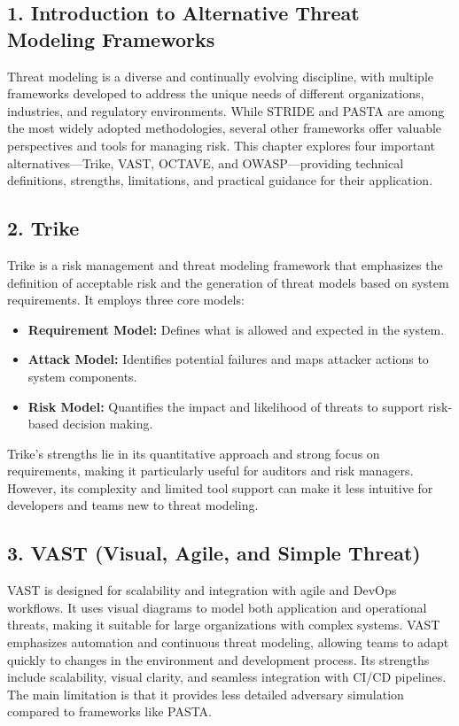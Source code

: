 

\subsection*{1. Introduction to Alternative Threat Modeling Frameworks}
Threat modeling is a diverse and continually evolving discipline, with multiple frameworks developed to address the unique needs of different organizations, industries, and regulatory environments. While STRIDE and PASTA are among the most widely adopted methodologies, several other frameworks offer valuable perspectives and tools for managing risk. This chapter explores four important alternatives—Trike, VAST, OCTAVE, and OWASP—providing technical definitions, strengths, limitations, and practical guidance for their application\cite{owasp,nist800154}.

\subsection*{2. Trike}
Trike is a risk management and threat modeling framework that emphasizes the definition of acceptable risk and the generation of threat models based on system requirements\cite{uceda2015}. It employs three core models:
\begin{itemize}
	\item \textbf{Requirement Model:} Defines what is allowed and expected in the system.
	\item \textbf{Attack Model:} Identifies potential failures and maps attacker actions to system components.
	\item \textbf{Risk Model:} Quantifies the impact and likelihood of threats to support risk-based decision making.
\end{itemize}
Trike’s strengths lie in its quantitative approach and strong focus on requirements, making it particularly useful for auditors and risk managers. However, its complexity and limited tool support can make it less intuitive for developers and teams new to threat modeling.

\subsection*{3. VAST (Visual, Agile, and Simple Threat)}
VAST is designed for scalability and integration with agile and DevOps workflows. It uses visual diagrams to model both application and operational threats, making it suitable for large organizations with complex systems. VAST emphasizes automation and continuous threat modeling, allowing teams to adapt quickly to changes in the environment and development process\cite{owasp}. Its strengths include scalability, visual clarity, and seamless integration with CI/CD pipelines. The main limitation is that it provides less detailed adversary simulation compared to frameworks like PASTA.

